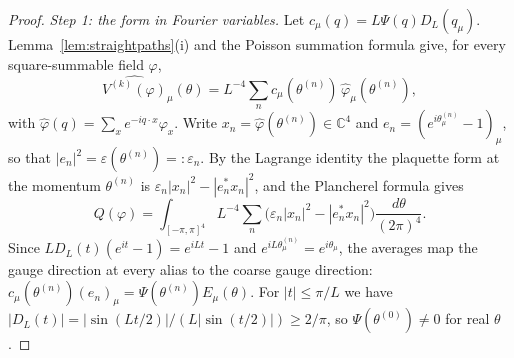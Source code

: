\documentclass[11pt]{amsart}
\theoremstyle{definition}
\theoremstyle{remark}
\numberwithin{equation}{section}
\newcommand{\C}{\mathbb{C}}
\begin{document}
\begin{proof}
\emph{Step 1: the form in Fourier variables.} Let $c_\mu(q)=L\Psi(q)
D_L(q_\mu)$. Lemma~\ref{lem:straightpaths}(i) and the Poisson summation
formula give, for every square-summable field $\varphi$,
\[
\widehat{V^{(k)}(\varphi)}_\mu(\theta)=L^{-4}\sum_nc_\mu(\theta^{(n)})\,
\hat\varphi_\mu(\theta^{(n)}),
\]
with $\hat\varphi(q)=\sum_xe^{-iq\cdot x}\varphi_x$. Write $x_n=\hat\varphi(
\theta^{(n)})\in\C^4$ and $e_n=(e^{i\theta^{(n)}_\mu}-1)_\mu$, so that
$|e_n|^2=\varepsilon(\theta^{(n)})=:\varepsilon_n$. By the Lagrange identity
the plaquette form at the momentum $\theta^{(n)}$ is $\varepsilon_n|x_n|^2-
|e_n^*x_n|^2$, and the Plancherel formula gives
\[
Q(\varphi)=\int_{[-\pi,\pi]^4}L^{-4}\sum_n\bigl(\varepsilon_n|x_n|^2-
|e_n^*x_n|^2\bigr)\frac{d\theta}{(2\pi)^4}.
\]
Since $LD_L(t)(e^{it}-1)=e^{iLt}-1$ and $e^{iL\theta^{(n)}_\mu}=
e^{i\theta_\mu}$, the averages map the gauge direction at every alias to the
coarse gauge direction: $c_\mu(\theta^{(n)})(e_n)_\mu=\Psi(\theta^{(n)})
E_\mu(\theta)$. For $|t|\le\pi/L$ we have $|D_L(t)|=|\sin(Lt/2)|/
(L|\sin(t/2)|)\ge2/\pi$, so $\Psi(\theta^{(0)})\ne0$ for real $\theta$.


\end{proof}
\end{document}
